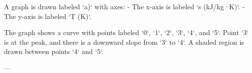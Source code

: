 A graph is drawn labeled `a)` with axes:  
- The x-axis is labeled `s (kJ/kg·K)`.  
- The y-axis is labeled `T (K)`.  

The graph shows a curve with points labeled `0`, `1`, `2`, `3`, `4`, and `5`. Point `3` is at the peak, and there is a downward slope from `3` to `4`. A shaded region is drawn between points `4` and `5`.  

---